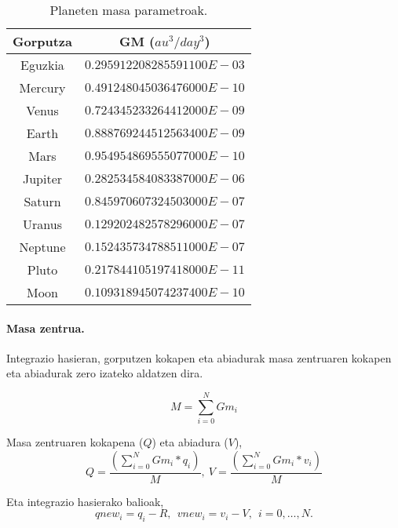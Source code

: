 \begin{table}[h]
\caption{Planeten masa parametroak.}
\label{tab:1}       %
\centering
\begin{tabular}{ c c }
\hline 
  Gorputza         &  GM ($au^3/day^3$)          \\\hline
  Eguzkia          &  $0.295912208285591100E-03$ \\\hline
  Mercury          &  $0.491248045036476000E-10$ \\\hline   
  Venus            &  $0.724345233264412000E-09$ \\\hline
  Earth            &  $0.888769244512563400E-09$ \\\hline
  Mars             &  $0.954954869555077000E-10$ \\\hline
  Jupiter          &  $0.282534584083387000E-06$ \\\hline
  Saturn           &  $0.845970607324503000E-07$ \\\hline
  Uranus           &  $0.129202482578296000E-07$ \\\hline
  Neptune          &  $0.152435734788511000E-07$ \\\hline
  Pluto            &  $0.217844105197418000E-11$ \\\hline
  Moon             &  $0.109318945074237400E-10$ \\\hline
\end{tabular}
\end{table}


\paragraph*{Masa zentrua.} Integrazio hasieran, gorputzen kokapen eta abiadurak   masa zentruaren kokapen eta abiadurak zero izateko aldatzen dira.

\begin{equation*}
M=\sum\limits_{i=0}^{N}Gm_i
\end{equation*} 

Masa zentruaren kokapena ($Q$) eta abiadura ($V$),
\begin{equation*}
Q=\frac{(\sum\limits_{i=0}^{N} Gm_i*q_i)}{M}, \ V=\frac{(\sum\limits_{i=0}^{N} Gm_i*v_i)}{M}
\end{equation*}

Eta integrazio hasierako balioak,
\begin{equation*}
qnew_i=q_i-R, \ \  vnew_i=v_i-V, \ \ i=0,\dots,N.
\end{equation*}


